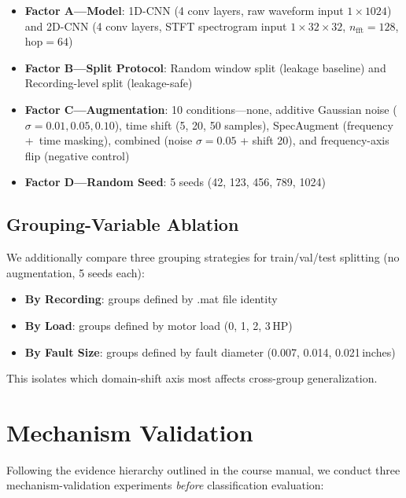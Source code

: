﻿\documentclass[11pt,a4paper]{article}
\begin{document}
\begin{itemize}[nosep]
    \item \textbf{Factor A---Model}: 1D-CNN (4 conv layers, raw waveform input $1\times1024$) and 2D-CNN (4 conv layers, STFT spectrogram input $1\times32\times32$, $n_{\text{fft}}=128$, $\text{hop}=64$)
    \item \textbf{Factor B---Split Protocol}: Random window split (leakage baseline) and Recording-level split (leakage-safe)
    \item \textbf{Factor C---Augmentation}: 10 conditions---none, additive Gaussian noise ($\sigma=0.01,0.05,0.10$), time shift (5, 20, 50 samples), SpecAugment (frequency\,+\ time masking), combined (noise $\sigma=0.05$ + shift 20), and frequency-axis flip (negative control)
    \item \textbf{Factor D---Random Seed}: 5 seeds (42, 123, 456, 789, 1024)
\end{itemize}

\subsection{Grouping-Variable Ablation}

We additionally compare three grouping strategies for train/val/test splitting (no augmentation, 5 seeds each):

\begin{itemize}[nosep]
    \item \textbf{By Recording}: groups defined by .mat file identity
    \item \textbf{By Load}: groups defined by motor load (0, 1, 2, 3\,HP)
    \item \textbf{By Fault Size}: groups defined by fault diameter (0.007, 0.014, 0.021\,inches)
\end{itemize}

This isolates which domain-shift axis most affects cross-group generalization.

\section{Mechanism Validation}
\label{sec:mechanism}

Following the evidence hierarchy outlined in the course manual, we conduct three mechanism-validation experiments \emph{before} classification evaluation:
\end{document}
